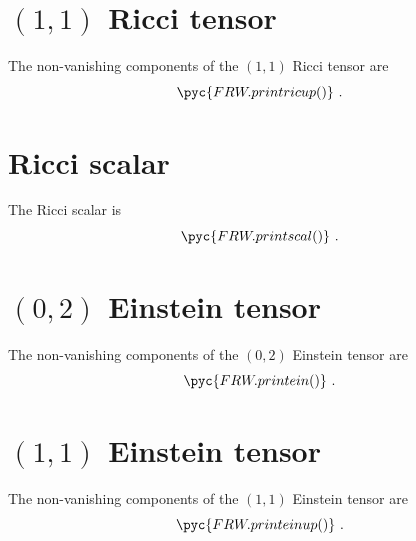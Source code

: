 \documentclass[a4paper, 12pt]{memoir}
\begin{document}
\section{$(1,1)$ Ricci tensor}
    The non-vanishing components of the $(1,1)$ Ricci tensor are
    \begin{equation*}
        \pyc{FRW.printricup()} ~.
    \end{equation*}

\section{Ricci scalar}
    The Ricci scalar is
    \begin{equation*}
        \pyc{FRW.printscal()} ~.
    \end{equation*}

\section{$(0,2)$ Einstein tensor}
    The non-vanishing components of the $(0,2)$ Einstein tensor are
    \begin{equation*}
        \pyc{FRW.printein()} ~.
    \end{equation*}

\section{$(1,1)$ Einstein tensor}
    The non-vanishing components of the $(1,1)$ Einstein tensor are
    \begin{equation*}
        \pyc{FRW.printeinup()} ~.
    \end{equation*}

\nocite{python}

\clearpage
{}
\printbibliography
\end{document}
